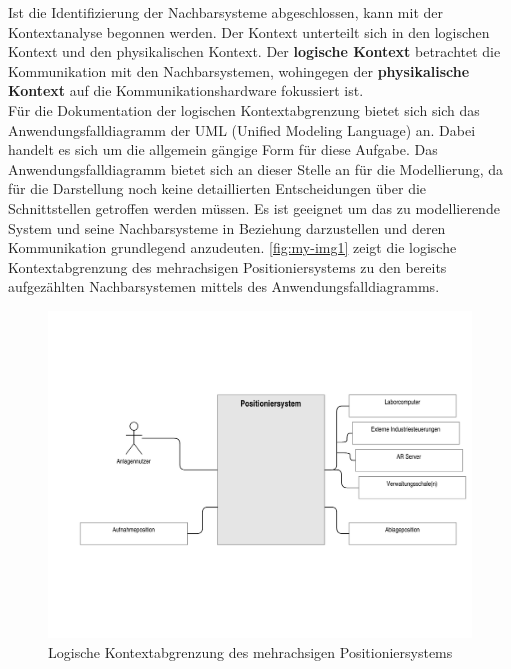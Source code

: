 \documentclass[../Bachelorarbeit.tex]{subfiles}
\begin{document}
Ist die Identifizierung der Nachbarsysteme abgeschlossen, kann mit der Kontextanalyse begonnen werden. Der Kontext unterteilt sich in den logischen Kontext und den physikalischen Kontext. Der \textbf{logische Kontext} betrachtet die Kommunikation mit den Nachbarsystemen, wohingegen der \textbf{physikalische Kontext} auf die Kommunikationshardware fokussiert ist.\\ %
Für die Dokumentation der logischen Kontextabgrenzung bietet sich sich das Anwendungsfalldiagramm der UML (Unified Modeling Language) an. Dabei handelt es sich um die allgemein gängige Form für diese Aufgabe. Das Anwendungsfalldiagramm bietet sich an dieser Stelle an für die Modellierung, da für die Darstellung noch keine detaillierten Entscheidungen über die Schnittstellen getroffen werden müssen. Es ist geeignet um das zu modellierende System und seine Nachbarsysteme in Beziehung darzustellen und deren Kommunikation grundlegend anzudeuten. \autoref{fig:my-img1} zeigt die logische Kontextabgrenzung des mehrachsigen Positioniersystems zu den bereits aufgezählten Nachbarsystemen mittels des Anwendungsfalldiagramms.\\ 

\begin{figure}[h]
    \centering
    \includegraphics[width=\textwidth]{Images/kontextana.pdf}
    \caption[Logische Kontextabgrenzung]{Logische Kontextabgrenzung des mehrachsigen Positioniersystems}
    \label{fig:my-img1}
\end{figure}
\end{document}
